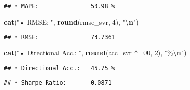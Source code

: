 \documentclass[
]{article}
\newenvironment{Shaded}{\begin{snugshade}}{\end{snugshade}}
\newcommand{\DecValTok}[1]{\textcolor[rgb]{0.00,0.00,0.81}{#1}}
\newcommand{\FunctionTok}[1]{\textcolor[rgb]{0.13,0.29,0.53}{\textbf{#1}}}
\newcommand{\NormalTok}[1]{#1}
\newcommand{\SpecialCharTok}[1]{\textcolor[rgb]{0.81,0.36,0.00}{\textbf{#1}}}
\newcommand{\StringTok}[1]{\textcolor[rgb]{0.31,0.60,0.02}{#1}}
\begin{document}
\begin{verbatim}
## • MAPE:               50.98 %
\end{verbatim}

\begin{Shaded}
\begin{Highlighting}[]
\FunctionTok{cat}\NormalTok{(}\StringTok{"• RMSE:              "}\NormalTok{, }\FunctionTok{round}\NormalTok{(rmse\_svr, }\DecValTok{4}\NormalTok{), }\StringTok{"}\SpecialCharTok{\textbackslash{}n}\StringTok{"}\NormalTok{)}
\end{Highlighting}
\end{Shaded}

\begin{verbatim}
## • RMSE:               73.7361
\end{verbatim}

\begin{Shaded}
\begin{Highlighting}[]
\FunctionTok{cat}\NormalTok{(}\StringTok{"• Directional Acc.:  "}\NormalTok{, }\FunctionTok{round}\NormalTok{(acc\_svr }\SpecialCharTok{*} \DecValTok{100}\NormalTok{, }\DecValTok{2}\NormalTok{), }\StringTok{"\%}\SpecialCharTok{\textbackslash{}n}\StringTok{"}\NormalTok{)}
\end{Highlighting}
\end{Shaded}

\begin{verbatim}
## • Directional Acc.:   46.75 %
\end{verbatim}

\begin{Shaded}
\end{Shaded}

\begin{verbatim}
## • Sharpe Ratio:       0.0871
\end{verbatim}

\begin{Shaded}
\end{Shaded}
\end{document}
